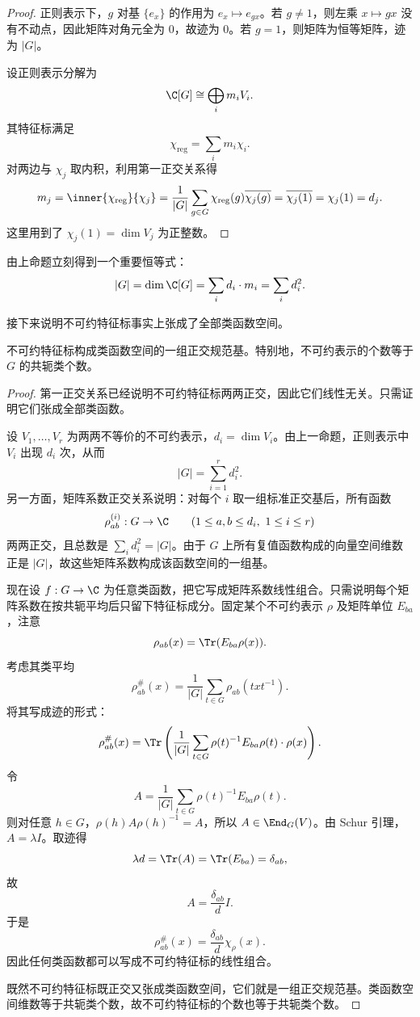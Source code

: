 \begin{proof}
正则表示下，$g$ 对基 $\{e_x\}$ 的作用为 $e_x\mapsto e_{gx}$。若 $g\neq 1$，则左乘 $x\mapsto gx$ 没有不动点，因此矩阵对角元全为 $0$，故迹为 $0$。若 $g=1$，则矩阵为恒等矩阵，迹为 $|G|$。

设正则表示分解为
\[
\C[G]\cong \bigoplus_i m_iV_i.
\]
其特征标满足
\[
\chi_{\mathrm{reg}}=\sum_i m_i\chi_i.
\]
对两边与 $\chi_j$ 取内积，利用第一正交关系得
\[
m_j=\inner{\chi_{\mathrm{reg}}}{\chi_j}
=\frac{1}{|G|}\sum_{g\in G}\chi_{\mathrm{reg}}(g)\overline{\chi_j(g)}
=\overline{\chi_j(1)}=\chi_j(1)=d_j.
\]
这里用到了 $\chi_j(1)=\dim V_j$ 为正整数。
\end{proof}

由上命题立刻得到一个重要恒等式：
\[
|G|=\dim \C[G]=\sum_i d_i\cdot m_i=\sum_i d_i^2.
\]

接下来说明不可约特征标事实上张成了全部类函数空间。

\begin{theorem}
不可约特征标构成类函数空间的一组正交规范基。特别地，不可约表示的个数等于 $G$ 的共轭类个数。
\end{theorem}

\begin{proof}
第一正交关系已经说明不可约特征标两两正交，因此它们线性无关。只需证明它们张成全部类函数。

设 $V_1,\dots,V_r$ 为两两不等价的不可约表示，$d_i=\dim V_i$。由上一命题，正则表示中 $V_i$ 出现 $d_i$ 次，从而
\[
|G|=\sum_{i=1}^r d_i^2.
\]
另一方面，矩阵系数正交关系说明：对每个 $i$ 取一组标准正交基后，所有函数
\[
\rho^{(i)}_{ab}:G\to \C \qquad (1\le a,b\le d_i,
\ 1\le i\le r)
\]
两两正交，且总数是 $\sum_i d_i^2=|G|$。由于 $G$ 上所有复值函数构成的向量空间维数正是 $|G|$，故这些矩阵系数构成该函数空间的一组基。

现在设 $f:G\to \C$ 为任意类函数，把它写成矩阵系数线性组合。只需说明每个矩阵系数在按共轭平均后只留下特征标成分。固定某个不可约表示 $\rho$ 及矩阵单位 $E_{ba}$，注意
\[
\rho_{ab}(x)=\Tr(E_{ba}\rho(x)).
\]
考虑其类平均
\[
\rho_{ab}^{\#}(x)=\frac{1}{|G|}\sum_{t\in G}\rho_{ab}(txt^{-1}).
\]
将其写成迹的形式：
\[
\rho_{ab}^{\#}(x)=\Tr\left(\frac{1}{|G|}\sum_{t\in G}\rho(t)^{-1}E_{ba}\rho(t)\cdot \rho(x)\right).
\]
令
\[
A=\frac{1}{|G|}\sum_{t\in G}\rho(t)^{-1}E_{ba}\rho(t).
\]
则对任意 $h\in G$，$\rho(h)A\rho(h)^{-1}=A$，所以 $A\in \End_G(V)$。由 Schur 引理，$A=\lambda I$。取迹得
\[
\lambda d=\Tr(A)=\Tr(E_{ba})=\delta_{ab},
\]
故
\[
A=\frac{\delta_{ab}}{d}I.
\]
于是
\[
\rho_{ab}^{\#}(x)=\frac{\delta_{ab}}{d}\chi_\rho(x).
\]
因此任何类函数都可以写成不可约特征标的线性组合。

既然不可约特征标既正交又张成类函数空间，它们就是一组正交规范基。类函数空间维数等于共轭类个数，故不可约特征标的个数也等于共轭类个数。
\end{proof}

